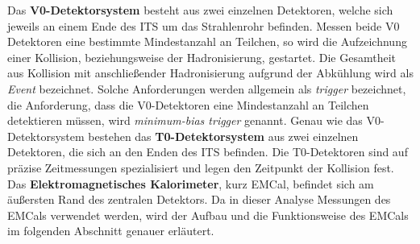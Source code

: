 \newline
Das \textbf{V0-Detektorsystem} besteht aus zwei einzelnen Detektoren, welche sich jeweils an einem Ende des ITS um das Strahlenrohr befinden.
Messen beide V0 Detektoren eine bestimmte Mindestanzahl an Teilchen, so wird die Aufzeichnung einer Kollision, beziehungsweise der Hadronisierung, gestartet.
Die Gesamtheit aus Kollision mit anschlie{\ss}ender Hadronisierung aufgrund der Abk\"uhlung wird als \textit{Event} bezeichnet.
Solche Anforderungen werden allgemein als \textit{trigger} bezeichnet, die Anforderung, dass die V0-Detektoren eine Mindestanzahl an Teilchen detektieren m\"ussen, wird \textit{minimum-bias trigger} genannt.
\newline
Genau wie das V0-Detektorsystem bestehen das \textbf{T0-Detektorsystem} aus zwei einzelnen Detektoren, die sich an den Enden des ITS befinden.
Die T0-Detektoren sind auf pr\"azise Zeitmessungen spezialisiert und legen den Zeitpunkt der Kollision fest.
\newline
Das \textbf{Elektromagnetisches Kalorimeter}, kurz EMCal, befindet sich am \"au{\ss}ersten Rand des zentralen Detektors.
Da in dieser Analyse Messungen des EMCals verwendet werden, wird der Aufbau und die Funktionsweise des EMCals im folgenden Abschnitt genauer erl\"autert.